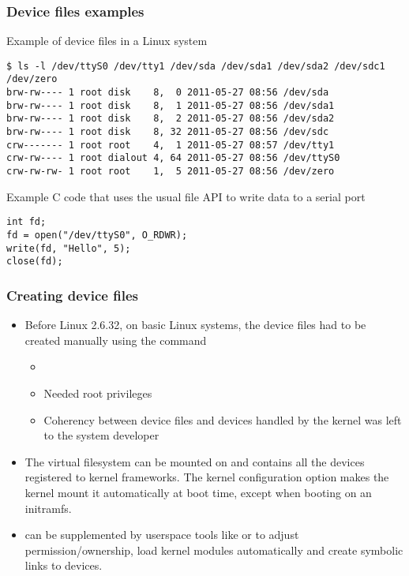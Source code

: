 \begin{frame}[fragile]
\frametitle{Device files examples}

Example of device files in a Linux system

\small
\begin{verbatim}
$ ls -l /dev/ttyS0 /dev/tty1 /dev/sda /dev/sda1 /dev/sda2 /dev/sdc1 /dev/zero
brw-rw---- 1 root disk    8,  0 2011-05-27 08:56 /dev/sda
brw-rw---- 1 root disk    8,  1 2011-05-27 08:56 /dev/sda1
brw-rw---- 1 root disk    8,  2 2011-05-27 08:56 /dev/sda2
brw-rw---- 1 root disk    8, 32 2011-05-27 08:56 /dev/sdc
crw------- 1 root root    4,  1 2011-05-27 08:57 /dev/tty1
crw-rw---- 1 root dialout 4, 64 2011-05-27 08:56 /dev/ttyS0
crw-rw-rw- 1 root root    1,  5 2011-05-27 08:56 /dev/zero
\end{verbatim}
\normalsize

Example C code that uses the usual file API to write data to a serial port

\small
\begin{verbatim}
int fd;
fd = open("/dev/ttyS0", O_RDWR);
write(fd, "Hello", 5);
close(fd);
\end{verbatim}
\end{frame}

\begin{frame}
  \frametitle{Creating device files}
  \begin{itemize}
    \item Before Linux 2.6.32, on basic Linux systems,
    the device files had to be created manually using the
     command
    \begin{itemize}
    \item {}
    \item Needed root privileges
    \item Coherency between device files and devices handled by the
      kernel was left to the system developer
    \end{itemize}
  \item The  virtual filesystem can be mounted on
     and contains all the devices registered to kernel frameworks.
    The  kernel configuration option
    makes the kernel mount it automatically at boot time, except
    when booting on an initramfs.
  \item {} can be supplemented by userspace tools like
     or  to adjust permission/ownership, load
    kernel modules automatically and create symbolic links to devices.
  \end{itemize}
\end{frame}

